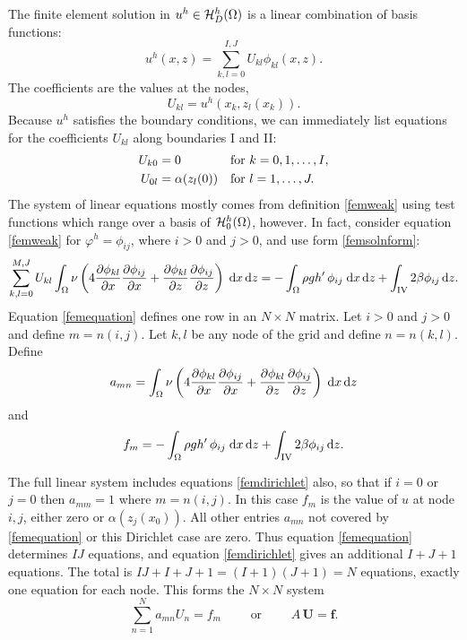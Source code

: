 \documentclass[11pt,final,reqno]{amsart}
\theoremstyle{remark}
\theoremstyle{definition}
\begin{document}
The finite element solution in $u^h\in \mathcal{H}^h_{D}(\Omega)$ is a linear combination of basis functions:
\begin{equation}
	u^h(x,z) = \sum_{k,l=0}^{I,J} U_{kl} \phi_{kl}(x,z).  \label{femsolnform}
\end{equation}
The coefficients are the values at the nodes, 
\begin{equation}
    U_{kl} = u^h(x_k,z_l(x_k)).  \label{coeffsarenodevalues}
\end{equation}
Because $u^h$ satisfies the boundary conditions, we can immediately list equations for the coefficients $U_{kl}$ along boundaries I and II:
\begin{align}
  U_{k0} &= 0              &&\text{for } k=0,1,\dots,I, \label{femdirichlet} \\
  U_{0l} &= \alpha(z_l(0)) &&\text{for } l=1,\dots,J. \notag
\end{align}
The system of linear equations mostly comes from definition \eqref{femweak} using test functions which range over a basis of $\mathcal{H}^h_{0}(\Omega)$, however.  In fact, consider equation \eqref{femweak} for $\varphi^h = \phi_{ij}$, where $i>0$ and $j>0$, and use form \eqref{femsolnform}:
\begin{equation}
  \sum_{k,l=0}^{M,J} U_{kl} \int_\Omega \nu \left(4\frac{\partial\phi_{kl}}{\partial x} \frac{\partial\phi_{ij}}{\partial x} + \frac{\partial\phi_{kl}}{\partial z} \frac{\partial\phi_{ij}}{\partial z}\right)\;\mathrm{d}x\,\mathrm{d}z = - \int_\Omega \rho g h'\,\phi_{ij} \;\mathrm{d}x\,\mathrm{d}z + \int_{\mathrm{IV}} 2 \beta \phi_{ij} \,\mathrm{d}z. \label{femequation}
\end{equation}
Equation \eqref{femequation} defines one row in an $N\times N$ matrix.  Let $i>0$ and $j>0$ and define $m=n(i,j)$.  Let $k,l$ be any node of the grid and define $n=n(k,l)$.  Define
\begin{equation}
a_{mn} = \int_\Omega \nu \left(4\frac{\partial\phi_{kl}}{\partial x} \frac{\partial\phi_{ij}}{\partial x} + \frac{\partial\phi_{kl}}{\partial z} \frac{\partial\phi_{ij}}{\partial z}\right)\;\mathrm{d}x\,\mathrm{d}z  \label{aintegral}
\end{equation}
and
\begin{equation}
f_m = - \int_\Omega \rho g h'\,\phi_{ij} \;\mathrm{d}x\,\mathrm{d}z + \int_{\mathrm{IV}} 2 \beta \phi_{ij} \,\mathrm{d}z. \label{fintegral}
\end{equation}

The full linear system includes equations \eqref{femdirichlet} also, so that if $i=0$ or $j=0$ then $a_{mm}=1$ where $m=n(i,j)$.  In this case $f_m$ is the value of $u$ at node $i,j$, either zero or $\alpha(z_j(x_0))$.  All other entries $a_{mn}$ not covered by \eqref{femequation} or this Dirichlet case are zero.  Thus equation \eqref{femequation} determines $IJ$ equations, and equation \eqref{femdirichlet} gives an additional $I+J+1$ equations.  The total is $IJ+I+J+1=(I+1)(J+1)=N$ equations, exactly one equation for each node.  This forms the $N\times N$ system
    $$\sum_{n=1}^N  a_{mn} U_n = f_m \qquad \text{ or } \qquad A\, \mathbf{U} = \mathbf{f}.$$
\end{document}
